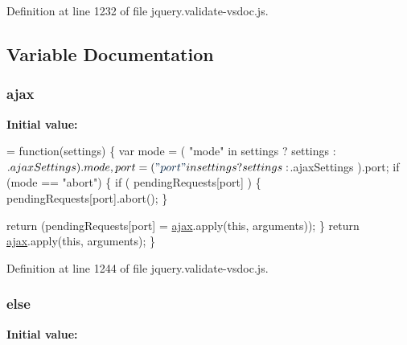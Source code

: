 Definition at line 1232 of file jquery.\+validate-\/vsdoc.\+js.



\subsection{Variable Documentation}
\hypertarget{jquery_8validate-vsdoc_8js_a77004c0fdc08a5bc07afa0b099cdf6df}{}
\subsubsection[{ajax}]{\setlength{\rightskip}{0pt plus 5cm}ajax}\label{jquery_8validate-vsdoc_8js_a77004c0fdc08a5bc07afa0b099cdf6df}
{\bfseries Initial value\+:}
\begin{DoxyCode}
= \textcolor{keyword}{function}(settings) \{
            var mode = ( \textcolor{stringliteral}{"mode"} in settings ? settings : $.ajaxSettings ).mode,
                port = ( \textcolor{stringliteral}{"port"} in settings ? settings : $.ajaxSettings ).port;
            \textcolor{keywordflow}{if} (mode == \textcolor{stringliteral}{"abort"}) \{
                \textcolor{keywordflow}{if} ( pendingRequests[port] ) \{
                    pendingRequests[port].abort();
                \}

                \textcolor{keywordflow}{return} (pendingRequests[port] = \hyperlink{jquery_8validate-vsdoc_8js_a77004c0fdc08a5bc07afa0b099cdf6df}{ajax}.apply(\textcolor{keyword}{this}, arguments));
            \}
            \textcolor{keywordflow}{return} \hyperlink{jquery_8validate-vsdoc_8js_a77004c0fdc08a5bc07afa0b099cdf6df}{ajax}.apply(\textcolor{keyword}{this}, arguments);
        \}
\end{DoxyCode}


Definition at line 1244 of file jquery.\+validate-\/vsdoc.\+js.

\hypertarget{jquery_8validate-vsdoc_8js_a0544c3fe466e421738dae463968b70ba}{}
\subsubsection[{else}]{\setlength{\rightskip}{0pt plus 5cm}else}\label{jquery_8validate-vsdoc_8js_a0544c3fe466e421738dae463968b70ba}
{\bfseries Initial value\+:}


